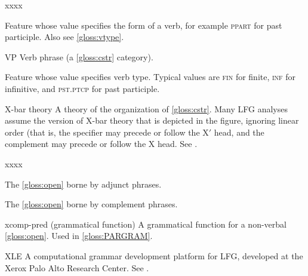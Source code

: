 \documentclass[output=paper,colorlinks,citecolor=brown]{langscibook}
\begin{document}
\begin{labeling}{xxxx}
\item[\VFORM] Feature whose value specifies the form of a verb, for example \textsc{ppart} for past participle.  Also see \ref{gloss:vtype}.

\item[VP\namedlabel{gloss:VP}{VP}] Verb phrase (a \ref{gloss:cstr} category).

\item[\VTYPE\namedlabel{gloss:vtype}{\VTYPE}] Feature whose value specifies verb type.  Typical values are \textsc{fin} for finite, \textsc{inf} for infinitive, and \textsc{pst.ptcp} for past participle.

\parpic[r]{\scalebox{.6}{\begin{forest}[XP [{YP\\(Specifier of XP)}][X$'$ [X$^0$] [{ZP\\(Complement of XP)}]]]\end{forest}}}\item[X-bar theory\namedlabel{gloss:Xbar}{X-bar theory}] A theory of the organization of \ref{gloss:cstr}.  Many LFG analyses assume the version of X-bar theory that is depicted in the figure, ignoring linear order (that is, the specifier may precede or follow the X$'$ head, and the complement may precede or follow the X head.  See \citetv[\ref{sect:xbar}]{chapters/CoreConcepts}.
\end{labeling}\begin{labeling}{xxxx} %

\item[\XADJ\namedlabel{gloss:xadj}{\XADJ}]The \ref{gloss:open} borne by adjunct phrases.

\item[\XCOMP\namedlabel{gloss:xcomp}{\XCOMP}] The \ref{gloss:open} borne by complement phrases.

\item[xcomp-pred] (grammatical function) A grammatical function for a non-verbal \ref{gloss:open}. Used in \ref{gloss:PARGRAM}.

\item[XLE\namedlabel{gloss:XLE}{XLE}] A computational grammar development platform for LFG, developed at the Xerox Palo Alto Research Center.  See \citetv[\ref{sec:ImpApp:XLE}]{chapters/ImplementationsApplications}.

\end{labeling}
\end{document}
